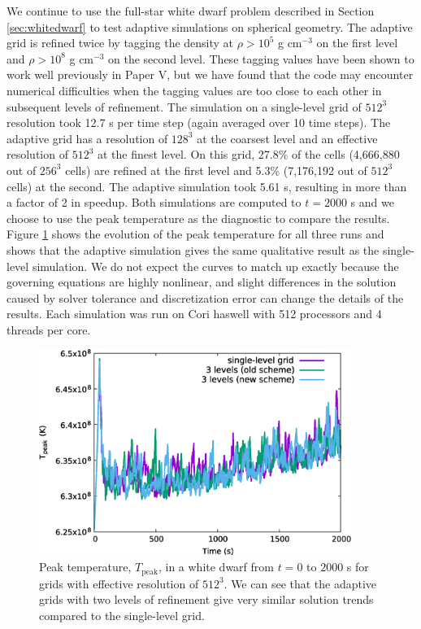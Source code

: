 We continue to use the full-star white dwarf problem described in Section \ref{sec:whitedwarf} to test adaptive simulations on spherical geometry. The adaptive grid is refined twice by tagging the density at $\rho > 10^5$ g cm$^{-3}$ on the first level and $\rho > 10^8$ g cm$^{-3}$ on the second level. These tagging values have been shown to work well previously in Paper V, but we have found that the code may encounter numerical difficulties when the tagging values are too close to each other in subsequent levels of refinement.
The simulation on a single-level grid of $512^3$ resolution took 12.7 s per time step (again averaged over 10 time steps).  The adaptive grid has a resolution of $128^3$ at the coarsest level and an effective resolution of $512^3$ at the finest level. On this grid, 27.8\% of the cells (4,666,880 out of $256^3$ cells) are refined at the first level and 5.3\% (7,176,192 out of $512^3$ cells) at the second. The adaptive simulation took 5.61 s, resulting in more than a factor of 2 in speedup. Both simulations are computed to $t=2000$ s and we choose to use the peak temperature as the diagnostic to compare the results. Figure \ref{fig:wdconvect_amr_Tmax} shows the evolution of the peak temperature for all three runs and shows that the adaptive simulation gives the same qualitative result as the single-level simulation. We do not expect the curves to match up exactly because the governing equations are highly nonlinear, and slight differences in the solution caused by solver tolerance and discretization error can change the details of the results. Each simulation was run on Cori haswell with 512 processors and 4 threads per core.

\begin{figure}[htb]
\begin{center}
\includegraphics[width=4.0in]{./figs/wdconvect_amr_Tmax}
\caption{\label{fig:wdconvect_amr_Tmax} Peak temperature, $T_{\text{peak}}$, in a white dwarf from $t=0$ to $2000$ s
         for grids with effective resolution of $512^3$. We can see that the adaptive grids with two levels of
         refinement give very similar solution trends compared to the single-level grid.}
\end{center}
\end{figure}
